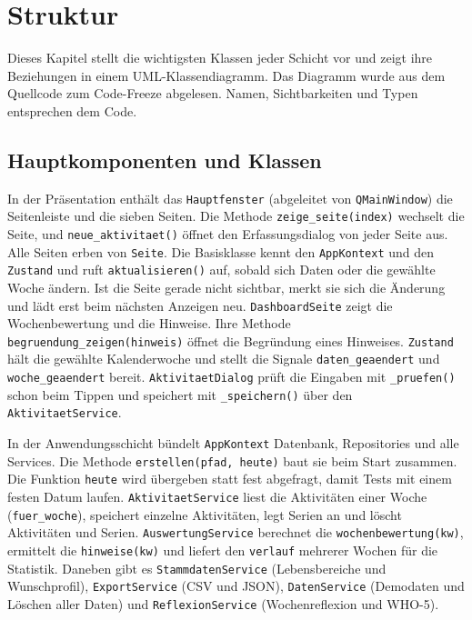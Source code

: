 \section{Struktur}
Dieses Kapitel stellt die wichtigsten Klassen jeder Schicht vor und zeigt ihre Beziehungen in einem \ac{UML}-Klassendiagramm. Das Diagramm wurde aus dem Quellcode zum Code-Freeze abgelesen. Namen, Sichtbarkeiten und Typen entsprechen dem Code.

\subsection{Hauptkomponenten und Klassen}
In der Präsentation enthält das \texttt{Hauptfenster} (abgeleitet von \texttt{QMainWindow}) die Seitenleiste und die sieben Seiten. Die Methode \texttt{zeige\_seite(index)} wechselt die Seite, und \texttt{neue\_aktivitaet()} öffnet den Erfassungsdialog von jeder Seite aus. Alle Seiten erben von \texttt{Seite}. Die Basisklasse kennt den \texttt{AppKontext} und den \texttt{Zustand} und ruft \texttt{aktualisieren()} auf, sobald sich Daten oder die gewählte Woche ändern. Ist die Seite gerade nicht sichtbar, merkt sie sich die Änderung und lädt erst beim nächsten Anzeigen neu. \texttt{DashboardSeite} zeigt die Wochenbewertung und die Hinweise. Ihre Methode \texttt{begruendung\_zeigen(hinweis)} öffnet die Begründung eines Hinweises. \texttt{Zustand} hält die gewählte Kalenderwoche und stellt die Signale \texttt{daten\_geaendert} und \texttt{woche\_geaendert} bereit. \texttt{AktivitaetDialog} prüft die Eingaben mit \texttt{\_pruefen()} schon beim Tippen und speichert mit \texttt{\_speichern()} über den \texttt{AktivitaetService}.

In der Anwendungsschicht bündelt \texttt{AppKontext} Datenbank, Repositories und alle Services. Die Methode \texttt{erstellen(pfad, heute)} baut sie beim Start zusammen. Die Funktion \texttt{heute} wird übergeben statt fest abgefragt, damit Tests mit einem festen Datum laufen. \texttt{AktivitaetService} liest die Aktivitäten einer Woche (\texttt{fuer\_woche}), speichert einzelne Aktivitäten, legt Serien an und löscht Aktivitäten und Serien. \texttt{AuswertungService} berechnet die \texttt{wochenbewertung(kw)}, ermittelt die \texttt{hinweise(kw)} und liefert den \texttt{verlauf} mehrerer Wochen für die Statistik. Daneben gibt es \texttt{StammdatenService} (Lebensbereiche und Wunschprofil), \texttt{ExportService} (CSV und JSON), \texttt{DatenService} (Demodaten und Löschen aller Daten) und \texttt{ReflexionService} (Wochenreflexion und WHO-5).


